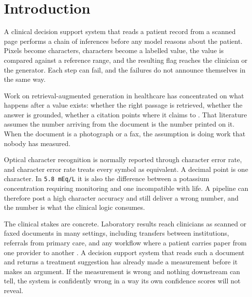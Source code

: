 \documentclass[11pt]{article}
\begin{document}
\begin{abstract}
\noindent \textbf{Conclusions:} Character-level accuracy is not a safety metric for pipelines
that reduce measurements to flags, and the errors such pipelines hide fall disproportionately on
patients whose values are already abnormal. In the conditions tested, verification by a second
independent reader reduced undetected errors more than any improvement to the recogniser itself.
All findings come from synthetic documents and bound no claim about performance in deployment.
\end{abstract}

\section{Introduction}

A clinical decision support system that reads a patient record from a scanned page performs a
chain of inferences before any model reasons about the patient. Pixels become characters,
characters become a labelled value, the value is compared against a reference range, and the
resulting flag reaches the clinician or the generator. Each step can fail, and the failures do
not announce themselves in the same way.

Work on retrieval-augmented generation in healthcare has concentrated on what happens after a
value exists: whether the right passage is retrieved, whether the answer is grounded, whether a
citation points where it claims to \citep{gao2023rag,amugongo2025rag,lu2024clinicalrag}. That
literature assumes the number arriving from the document is the number printed on it. When the
document is a photograph or a fax, the assumption is doing work that nobody has measured.

Optical character recognition is normally reported through character error rate, and character
error rate treats every symbol as equivalent. A decimal point is one character. In
\texttt{5.8 mEq/L} it is also the difference between a potassium concentration requiring
monitoring and one incompatible with life. A pipeline can therefore post a high character
accuracy and still deliver a wrong number, and the number is what the clinical logic consumes.

The clinical stakes are concrete. Laboratory results reach clinicians as scanned or faxed
documents in many settings, including transfers between institutions, referrals from primary
care, and any workflow where a patient carries paper from one provider to another
\citep{wang2026keycoverage}. A decision support system that reads such a document and returns a
treatment suggestion has already made a measurement before it makes an argument. If the
measurement is wrong and nothing downstream can tell, the system is confidently wrong in a way
its own confidence scores will not reveal.
\end{document}
